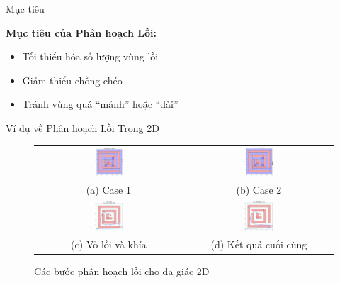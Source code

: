 \documentclass[aspectratio=169]{beamer}
\begin{document}
\begin{frame}{Mục tiêu}

    \textbf{Mục tiêu của Phân hoạch Lồi:}
    \begin{itemize}
        \item Tối thiểu hóa số lượng vùng lồi
        \item Giảm thiểu chồng chéo
        \item Tránh vùng quá ``mảnh'' hoặc ``dài''
    \end{itemize}

\end{frame}

\begin{frame}{Ví dụ về Phân hoạch Lồi Trong 2D}

    \begin{figure}
        \centering
        \begin{tabular}{cc}
            \includegraphics[width=0.2\textwidth]{../imgs/decompose-env3-1.png} &
            \includegraphics[width=0.2\textwidth]{../imgs/decompose-env3-2.png} \\
            \small (a) Case 1 & \small (b) Case 2 \\[1em]
            \includegraphics[width=0.2\textwidth]{../imgs/bezier-env3-1.png} &
            \includegraphics[width=0.2\textwidth]{../imgs/bezier-env3-2.png} \\
            \small (c) Vỏ lồi và khía & \small (d) Kết quả cuối cùng
        \end{tabular}
        \caption{\small Các bước phân hoạch lồi cho đa giác 2D}
    \end{figure}
        
\end{frame}
\end{document}
